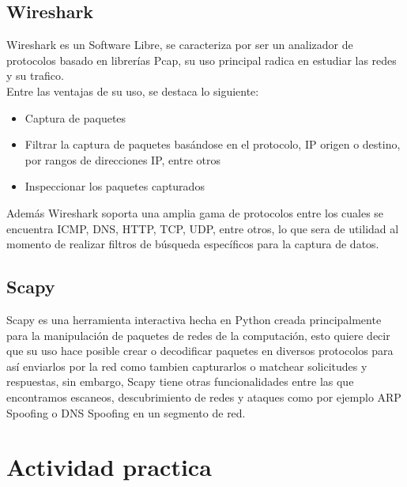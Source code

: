 \documentclass[spanish]{udpreport}
\begin{document}
\section{Wireshark}
Wireshark es un Software Libre, se caracteriza por ser un analizador de protocolos basado en librerías Pcap, su uso principal radica en estudiar las redes y su trafico.\\ Entre  las ventajas de su uso, se destaca lo siguiente:
\\
\begin{itemize}
    \item Captura de paquetes
    \item Filtrar la captura de paquetes basándose en el protocolo, IP origen o destino, por rangos de direcciones IP, entre otros
    \item Inspeccionar los paquetes capturados
\end{itemize}
Además Wireshark soporta una amplia gama de protocolos entre los cuales se encuentra ICMP, DNS, HTTP, TCP, UDP, entre otros, lo que sera de utilidad al momento de realizar filtros de búsqueda específicos para la captura de datos.
\section{Scapy}
Scapy es una herramienta interactiva hecha en Python creada principalmente para la manipulación de paquetes de redes de la computación, esto quiere decir que su uso hace posible crear o decodificar paquetes en diversos protocolos para así enviarlos por la red como tambien capturarlos o matchear solicitudes y respuestas, sin embargo, Scapy tiene otras funcionalidades entre las que encontramos escaneos, descubrimiento de redes y ataques como por ejemplo ARP Spoofing o DNS Spoofing en un segmento de red. 
\chapter{Actividad practica}
\end{document}
